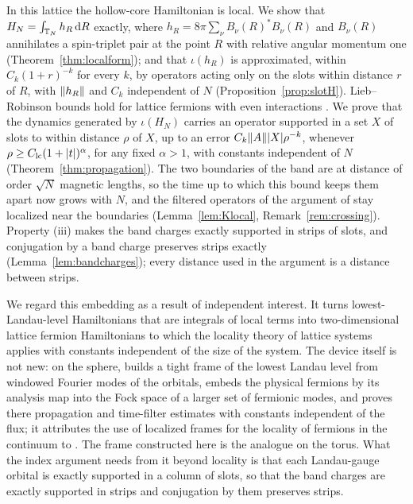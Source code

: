 In this lattice the hollow-core Hamiltonian is local. We show that
$H_N=\int_{\mathbb{T}_N}h_R\,\mathrm{d} R$ exactly, where $h_R=8\pi\sum_\nu B_\nu(R)^*B_\nu(R)$ and $B_\nu(R)$ annihilates
a spin-triplet pair at the point $R$ with relative angular momentum one (Theorem~\ref{thm:localform}); and
that $\iota(h_R)$ is approximated, within $C_k(1+r)^{-k}$ for every $k$, by operators acting only on the
slots within distance $r$ of $R$, with $\lVert h_R\rVert$ and $C_k$ independent of $N$ (Proposition~\ref{prop:slotH}).
Lieb--Robinson bounds \cite{LR72,NS06} hold for lattice fermions with even interactions \cite{NSY18}. We prove
that the dynamics generated by $\iota(H_N)$ carries an operator supported in
a set $X$ of slots to within distance $\rho$ of $X$, up to an error $C_k\lVert A\rVert\lvert X\rvert\rho^{-k}$, whenever
$\rho\ge C_{\rm lc}(1+\lvert t\rvert)^\alpha$, for any fixed $\alpha>1$, with constants independent of $N$
(Theorem~\ref{thm:propagation}). The two boundaries of the band are at distance of order $\sqrt N$ magnetic
lengths, so the time up to which this bound keeps them apart now grows with $N$, and the filtered operators
of the argument of \cite{BBDF21} stay localized near the boundaries (Lemma~\ref{lem:Klocal},
Remark~\ref{rem:crossing}). Property (iii) makes the band charges exactly supported in strips of slots, and
conjugation by a band charge preserves strips exactly (Lemma~\ref{lem:bandcharges}); every distance used in
the argument is a distance between strips.

We regard this embedding as a result of independent interest. It turns lowest-Landau-level Hamiltonians
that are integrals of local terms into two-dimensional lattice fermion Hamiltonians to which the locality
theory of lattice systems applies with constants independent of the size of the system. The device itself is not
new: on the sphere, \cite[Section~3]{OAI26} builds a tight frame of the lowest Landau level from windowed
Fourier modes of the orbitals, embeds the physical fermions by its analysis map into the Fock space of a larger set
of fermionic modes, and proves there propagation and time-filter estimates with constants independent of the flux;
it attributes the use of localized frames for the locality of fermions in the continuum to \cite{BDN24}. The frame
constructed here is the analogue on the torus. What the index argument needs from it beyond locality is that each
Landau-gauge orbital is exactly supported in a column of slots, so that the band charges are exactly supported in
strips and conjugation by them preserves strips.

